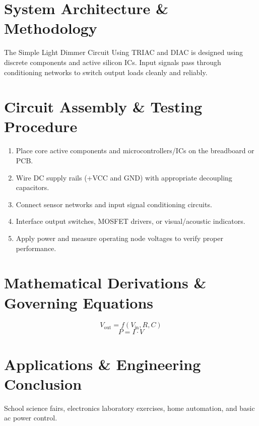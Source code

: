 \documentclass[11pt,a4paper]{article}
\begin{document}
\section{System Architecture \& Methodology}
The Simple Light Dimmer Circuit Using TRIAC and DIAC is designed using discrete components and active silicon ICs. Input signals pass through conditioning networks to switch output loads cleanly and reliably.

\section{Circuit Assembly \& Testing Procedure}
\begin{enumerate}
    \item Place core active components and microcontrollers/ICs on the breadboard or PCB.
    \item Wire DC supply rails (+VCC and GND) with appropriate decoupling capacitors.
    \item Connect sensor networks and input signal conditioning circuits.
    \item Interface output switches, MOSFET drivers, or visual/acoustic indicators.
    \item Apply power and measure operating node voltages to verify proper performance.
\end{enumerate}

\section{Mathematical Derivations \& Governing Equations}
\begin{equation}
V_{\text{out}} = f(V_{\text{in}}, R, C)
\end{equation}
\begin{equation}
P = I \cdot V
\end{equation}

\section{Applications \& Engineering Conclusion}
School science fairs, electronics laboratory exercises, home automation, and basic ac power control.
\end{document}
